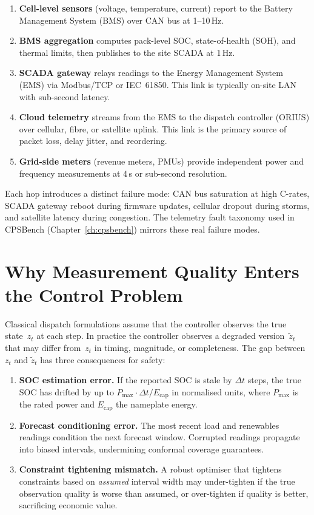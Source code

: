 \begin{enumerate}
  \item \textbf{Cell-level sensors} (voltage, temperature, current) report to
    the Battery Management System (BMS) over CAN bus at 1--10\,Hz.
  \item \textbf{BMS aggregation} computes pack-level SOC, state-of-health
    (SOH), and thermal limits, then publishes to the site SCADA at 1\,Hz.
  \item \textbf{SCADA gateway} relays readings to the Energy Management System
    (EMS) via Modbus/TCP or IEC~61850.  This link is typically on-site LAN
    with sub-second latency.
  \item \textbf{Cloud telemetry} streams from the EMS to the dispatch
    controller (ORIUS) over cellular, fibre, or satellite uplink.  This
    link is the primary source of packet loss, delay jitter, and reordering.
  \item \textbf{Grid-side meters} (revenue meters, PMUs) provide independent
    power and frequency measurements at 4\,s or sub-second resolution.
\end{enumerate}

Each hop introduces a distinct failure mode: CAN bus saturation at high
C-rates, SCADA gateway reboot during firmware updates, cellular dropout during
storms, and satellite latency during congestion.  The telemetry fault taxonomy
used in CPSBench (Chapter~\ref{ch:cpsbench}) mirrors these real failure modes.

\section{Why Measurement Quality Enters the Control Problem}

Classical dispatch formulations assume that the controller observes the true
state~$z_t$ at each step.  In practice the controller observes a degraded
version~$\tilde{z}_t$ that may differ from~$z_t$ in timing, magnitude, or
completeness.  The gap between $z_t$ and $\tilde{z}_t$ has three consequences
for safety:

\begin{enumerate}
  \item \textbf{SOC estimation error.}  If the reported SOC is stale by
    $\Delta t$ steps, the true SOC has drifted by up to
    $P_{\max} \cdot \Delta t / E_{\mathrm{cap}}$ in normalised units, where
    $P_{\max}$ is the rated power and $E_{\mathrm{cap}}$ the nameplate energy.
  \item \textbf{Forecast conditioning error.}  The most recent load and
    renewables readings condition the next forecast window.  Corrupted readings
    propagate into biased intervals, undermining conformal coverage guarantees.
  \item \textbf{Constraint tightening mismatch.}  A robust optimiser that
    tightens constraints based on \emph{assumed} interval width may
    under-tighten if the true observation quality is worse than assumed, or
    over-tighten if quality is better, sacrificing economic value.
\end{enumerate}


